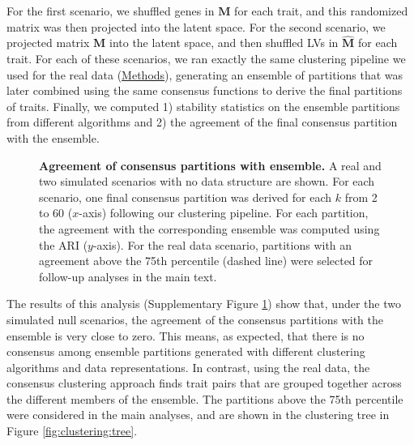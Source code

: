 \documentclass[
  a4paper,
]{article}
\newenvironment{fignos:tagged-figure}[1][]{
  \let\oldfigurename\figurename
  \renewcommand{\figurename}{Supplementary Figure}
}{
  \let\figurename\oldfigurename
}
\begin{document}
For the first scenario, we shuffled genes in \(\mathbf{M}\) for each trait, and this randomized matrix was then projected into the latent space.
For the second scenario, we projected matrix \(\mathbf{M}\) into the latent space, and then shuffled LVs in \(\hat{\mathbf{M}}\) for each trait.
For each of these scenarios, we ran exactly the same clustering pipeline we used for the real data (\protect\hyperlink{sec:methods:clustering}{Methods}), generating an ensemble of partitions that was later combined using the same consensus functions to derive the final partitions of traits.
Finally, we computed
1) stability statistics on the ensemble partitions from different algorithms
and 2) the agreement of the final consensus partition with the ensemble.

\begin{fignos:tagged-figure}[S13]

\begin{figure}
\hypertarget{fig:sup:clustering:agreement}{%
\centering

\caption{\textbf{Agreement of consensus partitions with ensemble.}
A real and two simulated scenarios with no data structure are shown.
For each scenario, one final consensus partition was derived for each \(k\) from 2 to 60 (\(x\)-axis) following our clustering pipeline.
For each partition, the agreement with the corresponding ensemble was computed using the ARI (\(y\)-axis).
For the real data scenario, partitions with an agreement above the 75th percentile (dashed line) were selected for follow-up analyses in the main text.}\label{fig:sup:clustering:agreement}
}
\end{figure}

\end{fignos:tagged-figure}

The results of this analysis (Supplementary Figure \ref{fig:sup:clustering:agreement}) show that, under the two simulated null scenarios, the agreement of the consensus partitions with the ensemble is very close to zero.
This means, as expected, that there is no consensus among ensemble partitions generated with different clustering algorithms and data representations.
In contrast, using the real data, the consensus clustering approach finds trait pairs that are grouped together across the different members of the ensemble.
The partitions above the 75th percentile were considered in the main analyses, and are shown in the clustering tree in Figure \ref{fig:clustering:tree}.
\end{document}

